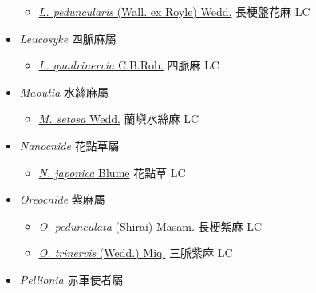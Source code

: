 \begin{itemize}
  \begin{itemize}
        \item[] \href{http://www.theplantlist.org/tpl1.1/search?q=Lecanthus+peduncularis}{\textit{L. peduncularis} (Wall. ex Royle) Wedd.}   長梗盤花麻   LC
  \end{itemize}
 \item[] \textit{Leucosyke} 四脈麻屬
                                
  \begin{itemize}
        \item[] \href{http://www.theplantlist.org/tpl1.1/search?q=Leucosyke+quadrinervia}{\textit{L. quadrinervia} C.B.Rob.}   四脈麻   LC
  \end{itemize}
 \item[] \textit{Maoutia} 水絲麻屬
                                
  \begin{itemize}
        \item[] \href{http://www.theplantlist.org/tpl1.1/search?q=Maoutia+setosa}{\textit{M. setosa} Wedd.}   蘭嶼水絲麻   LC
  \end{itemize}
 \item[] \textit{Nanocnide} 花點草屬
                                
  \begin{itemize}
        \item[] \href{http://www.theplantlist.org/tpl1.1/search?q=Nanocnide+japonica}{\textit{N. japonica} Blume}   花點草   LC
  \end{itemize}
 \item[] \textit{Oreocnide} 紫麻屬
                                
  \begin{itemize}
        \item[] \href{http://www.theplantlist.org/tpl1.1/search?q=Oreocnide+pedunculata}{\textit{O. pedunculata} (Shirai) Masam.}   長梗紫麻   LC
        \item[] \href{http://www.theplantlist.org/tpl1.1/search?q=Oreocnide+trinervis}{\textit{O. trinervis} (Wedd.) Miq.}   三脈紫麻   LC
  \end{itemize}
 \item[] \textit{Pellionia} 赤車使者屬
                                

\end{itemize}
